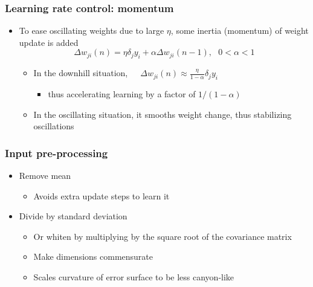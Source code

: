 \documentclass[12pt,notes,mathserif]{beamer}
\begin{document}
\begin{frame}[c]
\frametitle{Learning rate control: momentum}
\begin{itemize}
\item To ease oscillating weights due to large $\eta$, some inertia (momentum) of weight update is added
\[
\Delta w_{ji}(n)=\eta \delta_jy_i+\alpha\Delta w_{ji}(n-1), ~~~0<\alpha<1
\]\vspace*{-5mm}
		\begin{itemize}
		\item In the downhill situation,~~~$\Delta w_{ji}(n)\approx \frac{\eta}{1-\alpha}\delta_jy_i$
		\begin{itemize}
		\item  thus accelerating learning by a factor of $1/(1-\alpha)$

		\end{itemize}
		\item In the oscillating situation, it smooths weight change, thus stabilizing oscillations

		\end{itemize}
\end{itemize}
\end{frame}
\begin{frame}[c]
\frametitle{Input pre-processing}
\begin{itemize}
\item Remove mean
		\begin{itemize}
		\item  Avoids extra update steps to learn it

		\end{itemize}
\item Divide by standard deviation
		\begin{itemize}
		\item Or whiten by multiplying by the square root of the covariance matrix

		\item Make dimensions commensurate

		\item Scales curvature of error surface to be less canyon-like

		\end{itemize}

\end{itemize}

\end{frame}
\end{document}
